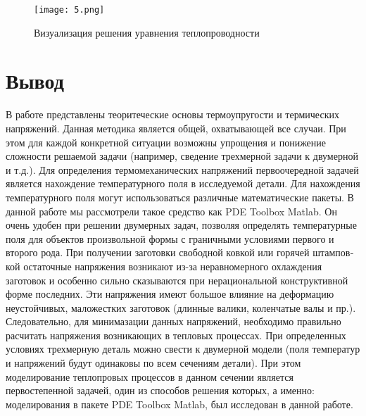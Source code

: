 \documentclass[a4paper,14pt]{article}
\begin{document}
 
  \begin{figure}[h]
 \label{222}
\centering
\texttt{[image: 5.png]}
\caption{Визуализация решения уравнения теплопроводности }
\end{figure} 


\section{Вывод}


В работе представлены теоритеческие основы термоупругости и термических напряжений. Данная методика является общей, охватывающей все случаи. При этом для каждой конкретной ситуации возможны упрощения и понижение сложности решаемой задачи (например, сведение трехмерной задачи к двумерной и т.д.). Для определения термомеханических напряжений первоочередной задачей является нахождение температурного поля в исследуемой детали. Для нахождения температурного поля могут использоваться различные математические пакеты. В данной работе мы рассмотрели такое средство как PDE Toolbox Matlab. Он очень удобен при решении двумерных задач, позволяя определять температурные поля для объектов произвольной формы с граничными условиями первого и второго рода. При получении заготовки свободной ковкой или горячей штампов­кой остаточные напряжения возникают из-за неравномерного охлажде­ния заготовок и особенно сильно сказываются при нерациональной кон­структивной форме последних. Эти напряжения имеют большое влияние на деформацию неустойчивых, маложестких заготовок (длинные валики, коленчатые валы и пр.). Следовательно, для минимазации данных напряжений, необходимо правильно расчитать напряжения возникающих в тепловых процессах.
При определенных условиях трехмерную деталь можно свести к двумерной модели (поля температур и напряжений будут одинаковы по всем сечениям детали). При этом моделирование теплопровых процессов в данном сечении является первостепенной задачей, один из способов решения которых, а именно: моделирования в пакете PDE Toolbox Matlab, был исследован в данной работе.

\newpage

%


\end{document}
